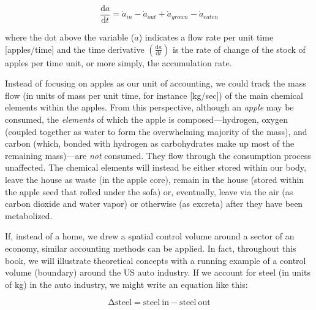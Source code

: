 \begin{equation} \label{eq:apple_rate_accounting}
	\frac{\mathrm{d}a}{\mathrm{d}t}
	= \dot{a}_{in}
	- \dot{a}_{out}
	+ \dot{a}_{grown}
	- \dot{a}_{eaten}
\end{equation}

\noindent{}where the dot above the variable ($\dot{a}$) indicates 
a flow rate per unit time [apples/time] and
the time derivative $\left( \frac{\mathrm{d}a}{\mathrm{d}t} \right)$ 
is the rate of change of the stock of apples per time unit, or more simply,
the accumulation rate.
 

Instead of focusing on apples as our unit of accounting, 
we could track the mass flow 
(in units of mass per unit time,
for instance  [kg/sec]) 
of the main chemical elements within the apples. 
From this perspective, 
although an \emph{apple} may be consumed,
the \emph{elements} of which the apple is 
composed---hydrogen, oxygen (coupled together as water
to form the overwhelming majority of the mass), 
and carbon (which, bonded with hydrogen as carbohydrates make up most 
of the remaining mass)---are \emph{not} consumed. 
They flow through the consumption process unaffected.
The chemical elements will instead be either stored within our body, 
leave the house as waste (in the apple core), 
remain in the house (stored within the apple seed 
that rolled under the sofa)
or, eventually, leave via the air (as carbon dioxide
and water vapor) or otherwise (as excreta) after they have
been metabolized.


If, instead of a home, we drew a spatial control volume 
around a sector of an economy, 
similar accounting methods can be applied. 
In fact, throughout this book, we will illustrate theoretical concepts with
a running example of a control volume (boundary) around the US auto industry. 
If we account for steel (in units of kg) in the auto industry, 
we might write an equation like this:

\begin{equation}
	\mathrm{\Delta}\mathrm{steel} 
	= \mathrm{steel~in} 
	- \mathrm{steel~out} 
\end{equation}

